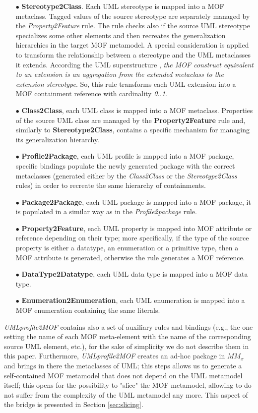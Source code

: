 \begin{itemize}
	\item[$\bullet$] \textbf{Stereotype2Class}. Each UML stereotype is mapped into a MOF metaclass.  		
	Tagged values of the source stereotype are separately managed by the \textit{Property2Feature} rule. 
	The rule checks also if the source UML stereotype specializes some other elements and then 
	recreates the generalization hierarchies in the target MOF metamodel.
	A special consideration is applied to transform the relationship between a stereotype and the UML metaclasses it extends.
	According the UML superstructure \cite{UML}, \textit{the MOF construct equivalent to an extension is an aggregation from
	the extended metaclass to the extension stereotype}. So, this rule transforms each UML extension into 
	a MOF containment reference with cardinality \textit{0..1}. 	
	\item[$\bullet$] \textbf{Class2Class}, each UML class is mapped into a MOF metaclass. 
	Properties of the source UML class are managed by the \textbf{Property2Feature} rule and, similarly to \textbf{Stereotype2Class},
	contains a specific mechanism for managing its generalization hierarchy.
	\item[$\bullet$] \textbf{Profile2Package}, each UML profile is mapped into a MOF package, specific bindings populate the newly generated 
	package with the correct metaclasses (generated either by the \textit{Class2Class} or the \textit{Stereotype2Class} rules) in order to
	recreate the same hierarchy of containments.
	\item[$\bullet$] \textbf{Package2Package}, each UML package is mapped into a MOF package, 
	it is populated in a similar way as in the \textit{Profile2package} rule.
	\item[$\bullet$] \textbf{Property2Feature}, each UML property is mapped into MOF attribute or reference
	depending on their type; more specifically, if the type of the source property is either a datatype, an enumeration or a primitive type, 
	then a MOF attribute is generated, otherwise the rule generates a MOF reference.  
	\item[$\bullet$] \textbf{DataType2Datatype}, each UML data type is mapped into a MOF data type.
	\item[$\bullet$] \textbf{Enumeration2Enumeration}, each UML enumeration is mapped into a MOF enumeration containing the same literals.
\end{itemize}

\textit{UMLprofile2MOF} contains also a set of auxiliary rules and bindings (e.g., the one setting the name of each MOF meta-element with the name of the corresponding source UML element, etc.), for the sake of simplicity we do not describe them in this paper.
Furthermore, \textit{UMLprofile2MOF} creates an ad-hoc package in $MM_x$ and brings in there the metaclasses of UML;
this steps allows us to generate a self-contained MOF metamodel that does not depend on the UML metamodel itself; this opens for the possibility to 
"slice" the MOF metamodel, allowing to do not suffer from the complexity of the UML metamodel any more. 
This aspect of the bridge is presented in Section \ref{sec:slicing}.


